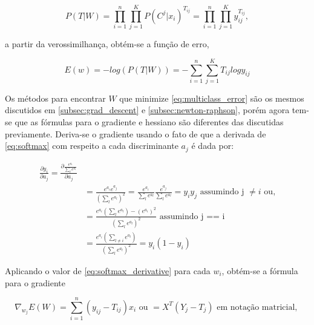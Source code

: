 \begin{center}
	\begin{equation}
				P(T | W) = \prod_{i = 1}^{n} \prod_{j = 1}^{K} P(C^j | x_i)^{T_{ij}} = \prod_{i = 1}^{n} \prod_{j = 1}^{K} y_{ij}^{T_{ij}},
	\end{equation}
\end{center}

a partir da verossimilhança, obtém-se a função de erro,

\begin{center}
	\begin{equation}
		\label{eq:multiclass_error}
		E(w) = - log(P(T | W)) = - \sum_{i = 1}^{n} \sum_{j = 1}^{K} T_{ij} log y_{ij}
	\end{equation}
\end{center}

Os métodos para encontrar $W$ que minimize \ref{eq:multiclass_error} são os mesmos discutidos em
\ref{subsec:grad_descent} e \ref{subsec:newton-raphson}, porém agora tem-se que as fórmulas
para o gradiente e hessiano são diferentes das discutidas previamente. Deriva-se o gradiente
usando o fato de que a derivada de \ref{eq:softmax} com respeito a cada discriminante $a_j$
é dada por:


\begin{center}
	\begin{equation}
	\begin{split}\label{eq:softmax_derivative}
		\frac{\partial y_i}{\partial a_j} = \frac{\partial \frac{e^{a_i}}{\sum_l e^{a_l}}}{\partial a_j}  \\
	& = \frac{e^{a_i}e^{a_j}}{(\sum_l e^{a_l})^2} = \frac{e^{a_i}}{\sum_l e^{a_l}}\frac{e^{a_j}}{\sum_l e^{a_l}} = y_iy_j \text{ assumindo j } \neq i  \text{ ou,}\\
	& = \frac{e^{a_i}(\sum_l e^{a_l}) - (e^{a_i})^2}{(\sum_l e^{a_l})^2} \text{ assumindo j == i} \\
	& = \frac{e^{a_i}(\sum_{l \neq i} e^{a_l})}{(\sum_l e^{a_l})^2} = y_i(1 - y_i)
	\end{split}
	\end{equation}
\end{center}

Aplicando o valor de \ref{eq:softmax_derivative} para cada $w_i$, obtém-se a fórmula para o gradiente

\begin{center}
	\begin{equation}
		\nabla_{w_j} E(W) = \sum_{i =  1}^n (y_{ij} - T_{ij})x_i \text{ ou } = X^T(Y_{j} - T_{j}) \text{ em notação matricial, }
	\end{equation}
\end{center}

